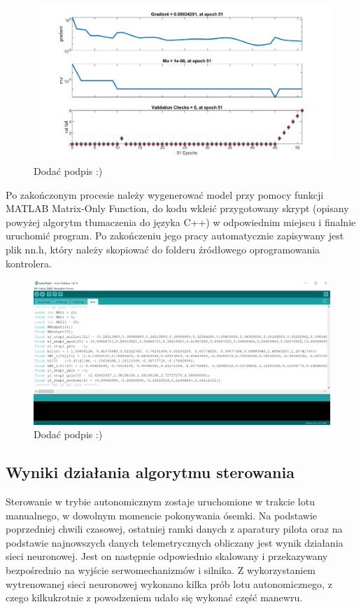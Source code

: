 \documentclass[12pt, a4paper]{article}
\begin{document}
 \begin{figure}[ht]
    \centering
    \includegraphics[width=1\textwidth]{training_state}
    \caption{Dodać podpis :)}
\end{figure}

Po zakończonym procesie należy wygenerować model przy pomocy funkcji MATLAB Matrix-Only Function, do kodu wkleić przygotowany skrypt (opisany powyżej algorytm tłumaczenia do języka C++) w odpowiednim miejscu i finalnie uruchomić program. Po zakończeniu jego pracy automatycznie zapisywany jest plik nn.h, który należy skopiować do folderu źródłowego oprogramowania kontrolera.

 \begin{figure}[ht]
    \centering
    \includegraphics[width=1\textwidth]{nnh}
    \caption{Dodać podpis :)}
\end{figure}

\FloatBarrier

\subsection{Wyniki działania algorytmu sterowania}
Sterowanie w trybie autonomicznym zostaje uruchomione w trakcie lotu manualnego, w dowolnym momencie pokonywania ósemki. Na podstawie poprzedniej chwili czasowej, ostatniej ramki danych z aparatury pilota oraz na podstawie najnowszych danych telemetrycznych obliczany jest wynik działania sieci neuronowej. Jest on następnie odpowiednio skalowany i przekazywany bezpośrednio na wyjście serwomechanizmów i silnika. Z wykorzystaniem wytrenowanej sieci neuronowej wykonano kilka prób lotu autonomicznego, z czego kilkukrotnie z powodzeniem udało się wykonać część manewru. 
\end{document}
